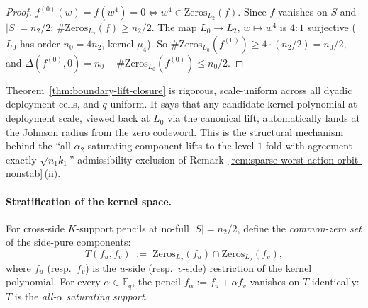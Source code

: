 \documentclass[11pt]{article}
\theoremstyle{definition}
\theoremstyle{remark}
\newcommand{\FF}{\mathbb{F}}
\begin{document}
\begin{proof}
$f^{(0)}(w) = f(w^4) = 0 \iff w^4 \in \mathrm{Zeros}_{L_2}(f)$. Since $f$
vanishes on $S$ and $|S| = n_2/2$:
$\#\mathrm{Zeros}_{L_2}(f) \geq n_2/2$. The map $L_0 \to L_2$, $w \mapsto w^4$
is $4{:}1$ surjective ($L_0$ has order $n_0 = 4 n_2$, kernel $\mu_4$). So
$\#\mathrm{Zeros}_{L_0}(f^{(0)}) \geq 4 \cdot (n_2/2) = n_0/2$, and
$\Delta(f^{(0)}, 0) = n_0 - \#\mathrm{Zeros}_{L_0}(f^{(0)}) \leq n_0/2$.
\end{proof}

\noindent Theorem~\ref{thm:boundary-lift-closure} is rigorous, scale-uniform
across all dyadic deployment cells, and $q$-uniform. It says that any
candidate kernel polynomial at deployment scale, viewed back at $L_0$ via
the canonical lift, automatically lands at the Johnson radius from the zero
codeword. This is the structural mechanism behind the
``all-$\alpha_2$ saturating component lifts to the level-$1$ fold with
agreement exactly $\sqrt{n_1 k_1}$'' admissibility exclusion of
Remark~\ref{rem:sparse-worst-action-orbit-nonstab}\,(ii).

\paragraph{Stratification of the kernel space.}
For cross-side $K$-support pencils at no-full $|S| = n_2/2$, define the
\emph{common-zero set} of the side-pure components:
\[
T(f_u, f_v) \;:=\; \mathrm{Zeros}_{L_2}(f_u) \cap \mathrm{Zeros}_{L_2}(f_v),
\]
where $f_u$ (resp.\ $f_v$) is the $u$-side (resp.\ $v$-side) restriction of
the kernel polynomial. For every $\alpha \in \FF_q$, the pencil
$f_\alpha := f_u + \alpha f_v$ vanishes on $T$ identically: $T$ is the
\emph{all-$\alpha$ saturating support}.
\end{document}

